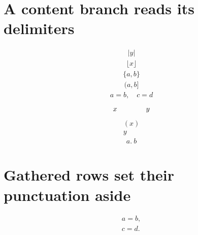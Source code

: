 \documentclass{article}
\begin{document}
\section{A content branch reads its delimiters}
\[\begin{gathered}|y|\end{gathered}\]
\[\begin{gathered}\lfloor x\rfloor\end{gathered}\]
\[\begin{gathered}\{a,b\}\end{gathered}\]
\[\begin{gathered}(a,b]\end{gathered}\]
\[\begin{gathered}a=b,\quad c=d\end{gathered}\]
\[x\hphantom{abcdefgh}y\]
\[\begin{gathered}(\!x)\\ \!y\end{gathered}\]
\[\begin{gathered}a.\ b\end{gathered}\]

\section{Gathered rows set their punctuation aside}
\[\begin{gathered} a=b,\\ c=d.\end{gathered}\]
\end{document}
